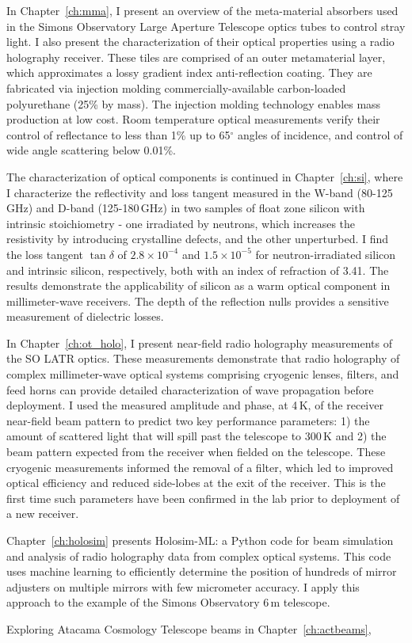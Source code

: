 In Chapter~\ref{ch:mma}, I present an overview of the meta-material absorbers used in the Simons Observatory Large Aperture Telescope optics tubes to control stray light.  I also present the characterization of their optical properties using a radio holography receiver.  These tiles are comprised of an outer metamaterial layer, which approximates a lossy gradient index anti-reflection coating. They are fabricated via injection molding commercially-available carbon-loaded polyurethane (25\% by mass). The injection molding technology enables mass production at low cost.  Room temperature optical measurements verify their control of reflectance to less than 1\% up to 65$^{\circ}$ angles of incidence, and control of wide angle scattering below 0.01\%.

The characterization of optical components is continued in Chapter~\ref{ch:si}, where I characterize the reflectivity and loss tangent measured in the W-band (80-125\,GHz) and D-band (125-180\,GHz) in two samples of float zone silicon with intrinsic stoichiometry - one irradiated by neutrons, which increases the resistivity by introducing crystalline defects, and the other unperturbed.  I find the loss tangent $\tan\delta$ of $2.8\times10^{-4}$ and $1.5\times10^{-5}$ for neutron-irradiated silicon and intrinsic silicon, respectively, both with an index of refraction of 3.41.  The results demonstrate the applicability of silicon as a warm optical component in millimeter-wave receivers.  The depth of the reflection nulls provides a sensitive measurement of dielectric losses.

In Chapter~\ref{ch:ot_holo}, I present near-field radio holography measurements of the SO LATR optics.  These measurements demonstrate that radio holography of complex millimeter-wave optical systems comprising cryogenic lenses, filters, and feed horns can provide detailed characterization of wave propagation before deployment.  I used the measured amplitude and phase, at 4\,K, of the receiver near-field beam pattern to predict two key performance parameters: 1) the amount of scattered light that will spill past the telescope to 300\,K and 2) the beam pattern expected from the receiver when fielded on the telescope.  These cryogenic measurements informed the removal of a filter, which led to improved optical efficiency and reduced side-lobes at the exit of the receiver.  This is the first time such parameters have been confirmed in the lab prior to deployment of a new receiver.

Chapter~\ref{ch:holosim} presents Holosim-ML: a Python code for beam simulation and analysis of radio holography data from complex optical systems.  This code uses machine learning to efficiently determine the position of hundreds of mirror adjusters on multiple mirrors with few micrometer accuracy.  I apply this approach to the example of the Simons Observatory 6\,m telescope.

Exploring Atacama Cosmology Telescope beams in Chapter~\ref{ch:actbeams}, 

